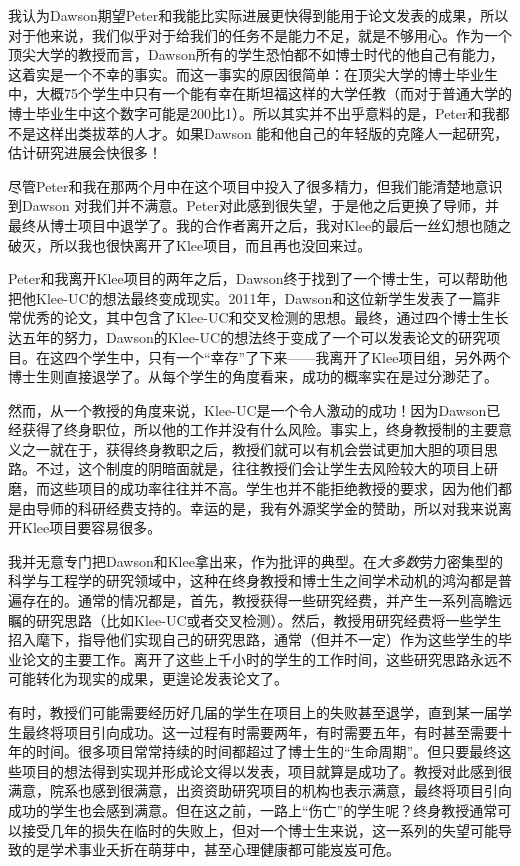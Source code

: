 \documentclass[letter,12pt]{book}
\begin{document}
\begin{CJK}{UTF8}{gbsn}
我认为Dawson期望Peter和我能比实际进展更快得到能用于论文发表的成果，所以对于他来说，我们似乎对于给我们的任务不是能力不足，就是不够用心。作为一个顶尖大学的教授而言，Dawson所有的学生恐怕都不如博士时代的他自己有能力，这着实是一个不幸的事实。而这一事实的原因很简单：在顶尖大学的博士毕业生中，大概75个学生中只有一个能有幸在斯坦福这样的大学任教（而对于普通大学的博士毕业生中这个数字可能是200比1）。所以其实并不出乎意料的是，Peter和我都不是这样出类拔萃的人才。如果Dawson 能和他自己的年轻版的克隆人一起研究，估计研究进展会快很多！

尽管Peter和我在那两个月中在这个项目中投入了很多精力，但我们能清楚地意识到Dawson 对我们并不满意。Peter对此感到很失望，于是他之后更换了导师，并最终从博士项目中退学了。我的合作者离开之后，我对Klee的最后一丝幻想也随之破灭，所以我也很快离开了Klee项目，而且再也没回来过。

\breakline

Peter和我离开Klee项目的两年之后，Dawson终于找到了一个博士生，可以帮助他把他Klee-UC的想法最终变成现实。2011年，Dawson和这位新学生发表了一篇非常优秀的论文，其中包含了Klee-UC和交叉检测的思想。最终，通过四个博士生长达五年的努力，Dawson的Klee-UC的想法终于变成了一个可以发表论文的研究项目。在这四个学生中，只有一个“幸存”了下来——我离开了Klee项目组，另外两个博士生则直接退学了。从每个学生的角度看来，成功的概率实在是过分渺茫了。

然而，从一个教授的角度来说，Klee-UC是一个令人激动的成功！因为Dawson已经获得了终身职位，所以他的工作并没有什么风险。事实上，终身教授制的主要意义之一就在于，获得终身教职之后，教授们就可以有机会尝试更加大胆的项目思路。不过，这个制度的阴暗面就是，往往教授们会让学生去风险较大的项目上研磨，而这些项目的成功率往往并不高。学生也并不能拒绝教授的要求，因为他们都是由导师的科研经费支持的。幸运的是，我有外源奖学金的赞助，所以对我来说离开Klee项目要容易很多。

我并无意专门把Dawson和Klee拿出来，作为批评的典型。在\emph{大多数}劳力密集型的科学与工程学的研究领域中，这种在终身教授和博士生之间学术动机的鸿沟都是普遍存在的。通常的情况都是，首先，教授获得一些研究经费，并产生一系列高瞻远瞩的研究思路（比如Klee-UC或者交叉检测）。然后，教授用研究经费将一些学生招入麾下，指导他们实现自己的研究思路，通常（但并不一定）作为这些学生的毕业论文的主要工作。离开了这些上千小时的学生的工作时间，这些研究思路永远不可能转化为现实的成果，更遑论发表论文了。

有时，教授们可能需要经历好几届的学生在项目上的失败甚至退学，直到某一届学生最终将项目引向成功。这一过程有时需要两年，有时需要五年，有时甚至需要十年的时间。很多项目常常持续的时间都超过了博士生的“生命周期”。但只要最终这些项目的想法得到实现并形成论文得以发表，项目就算是成功了。教授对此感到很满意，院系也感到很满意，出资资助研究项目的机构也表示满意，最终将项目引向成功的学生也会感到满意。但在这之前，一路上“伤亡”的学生呢？终身教授通常可以接受几年的损失在临时的失败上，但对一个博士生来说，这一系列的失望可能导致的是学术事业夭折在萌芽中，甚至心理健康都可能岌岌可危。


\end{CJK}
\end{document}
